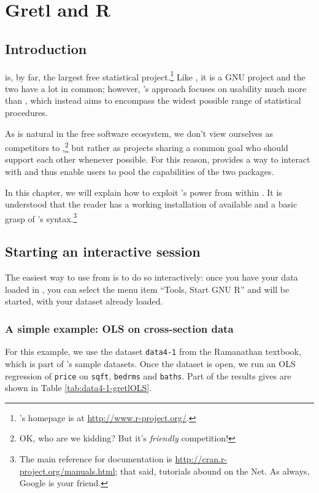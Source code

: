 \chapter{Gretl and R}
\label{gretlR}

\section{Introduction}
\label{R-intro}

 is, by far, the largest free statistical
project.\footnote{'s homepage is at
  \url{http://www.r-project.org/}.} Like , it is a GNU
project and the two have a lot in common; however, 's
approach focuses on usability much more than , which instead
aims to encompass the widest possible range of statistical procedures.

As is natural in the free software ecosystem, we don't view ourselves
as competitors to ,\footnote{OK, who are we kidding? But it's
  \emph{friendly} competition!} but rather as projects sharing a common
goal who should support each other whenever possible. For this reason,
 provides a way to interact with  and thus enable
users to pool the capabilities of the two packages.

In this chapter, we will explain how to exploit 's power from
within . It is understood that the reader has a working
installation of  available and a basic grasp of 's
syntax.\footnote{The main reference for  documentation is
  \url{http://cran.r-project.org/manuals.html}; that said, 
  tutorials abound on the Net. As always, Google is your friend.}


\section{Starting an interactive  session}
\label{sec:R-interactive}

The easiest way to use  from  is to do so
interactively: once you have your data loaded in , you can
select the menu item ``Tools, Start GNU R'' and  will be
started, with your dataset already loaded.

\subsection{A simple example: OLS on cross-section data}
\label{sec:R-ols-ex}

For this example, we use the dataset \texttt{data4-1} from the
Ramanathan textbook, which is part of 's sample
datasets. Once the dataset is open, we run an OLS regression of
\texttt{price} on \texttt{sqft}, \texttt{bedrms} and
\texttt{baths}. Part of the results  gives are shown in Table
\ref{tab:data4-1-gretlOLS}.

